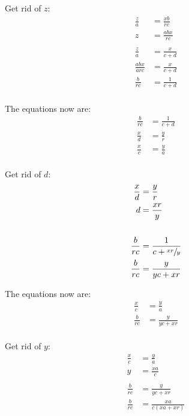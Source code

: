 \documentclass{exam}
\begin{document}
\begin{description}
      Get rid of $z$:
      \begin{align*}
        \frac{z}{a}     & = \frac{xb}{rc} \\
        z               & = \frac{abx}{rc} \\
        \\
        \frac{z}{a}     & = \frac{x}{c + d} \\
        \frac{abx}{arc} & = \frac{x}{c + d} \\
        \frac{b}{rc}    & = \frac{1}{c + d} \\
      \end{align*}

      The equations now are:
      \begin{align*}
        \frac{b}{rc} & = \frac{1}{c + d} \\
        \frac{x}{d}  & = \frac{y}{r} \\
        \frac{x}{c}  & = \frac{y}{a} \\
      \end{align*}

      Get rid of $d$:
      \begin{align*}
        \frac{x}{d}  & = \frac{y}{r} \\
        d            & = \frac{xr}{y} \\
        \\
        \frac{b}{rc} & = \frac{1}{c + \sfrac{xr}{y}} \\
        \frac{b}{rc} & = \frac{y}{yc + xr} \\
      \end{align*}

      The equations now are:
      \begin{align*}
        \frac{x}{c}  & = \frac{y}{a} \\
        \frac{b}{rc} & = \frac{y}{yc + xr} \\
      \end{align*}

      Get rid of $y$:
      \begin{align*}
        \frac{x}{c}  & = \frac{y}{a} \\
        y            & = \frac{xa}{c} \\
        \\
        \frac{b}{rc} & = \frac{y}{yc + xr} \\
        \frac{b}{rc} & = \frac{xa}{c(xa + xr)} \\
      \end{align*}


\end{description}
\end{document}
